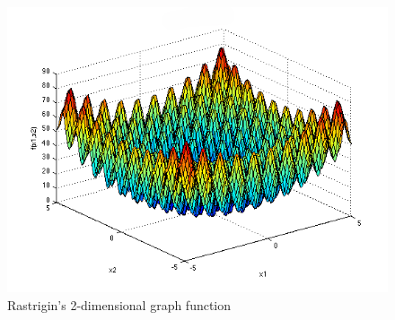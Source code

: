 \documentclass{article}
\begin{document}
\begin{figure}[!h]
\includegraphics[width=\textwidth,height=\textheight,keepaspectratio]{rastrigin.png}
  \caption{Rastrigin's 2-dimensional graph function \cite{sf-uni-ra}}
\end{figure}

\end{document}
